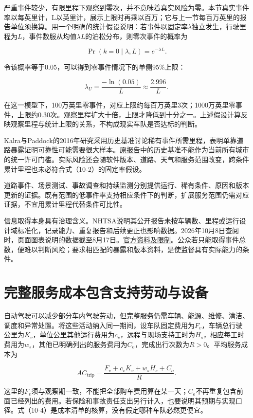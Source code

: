 \documentclass[UTF8,fontset=windows,12pt,a4paper,oneside,openany]{ctexbook}
\begin{document}
严重事件较少，有限里程下观察到零次，并不意味着真实风险为零。本节真实事件率以每英里计，L以英里计，展示上限时再乘以百万；它与上一节每百万英里的报告单位须换算。用一个明确的统计假设说明：若事件以固定率\(\lambda\)独立发生，行驶里程为\(L\)，事件数服从均值\(\lambda L\)的泊松分布，则零次事件的概率为

\[
\Pr(k=0\mid\lambda,L)=e^{-\lambda L}.
\tag{10-2}
\]

令该概率等于0.05，可以得到零事件情况下的单侧95\%上限：

\[
\lambda_U=\frac{-\ln(0.05)}{L}\approx\frac{2.996}{L}.
\tag{10-3}
\]

在这一模型下，100万英里零事件，对应上限约每百万英里3次；1000万英里零事件，上限约0.30次。观察里程扩大十倍，上限才降低到十分之一。上述假设计算反映观察里程与统计上限的关系，不构成现实车队是否达标的判断。

Kalra与Paddock的2016年研究采用历史基准讨论稀有事件所需里程，表明单靠道路暴露证明可靠性可能需要很大样本。\href{https://doi.org/10.7249/RR1478}{原报告}中的历史基准不能作为当前所有城市的统一许可门槛。实际风险还会随软件版本、道路、天气和服务范围改变，跨条件累计里程也未必符合式（10-2）的固定率假设。

道路事件、场景测试、事故调查和持续监测分别提供运行、稀有条件、原因和版本更新的证据。既有范围的低事件率支持相应条件下的判断，扩展服务范围仍需对应证据，不宜用累计里程代替条件可比性。

信息取得本身具有治理含义。NHTSA说明其公开报告未按车辆数、里程或运行设计域标准化，记录能力、重复报告和后续更正也影响数据。2026年10月8日查阅时，页面图表说明的数据截至8月17日。\href{https://www.nhtsa.gov/laws-regulations/standing-general-order-crash-reporting}{官方资料及限制}。公众若只能取得事件总数，便难以判断风险；要求相匹配的暴露和版本资料，是使监督具有实际能力的条件。

\section{完整服务成本包含支持劳动与设备}

自动驾驶可以减少部分车内驾驶劳动，但完整服务仍需车辆、能源、维修、清洁、调度和异常处置。将这些活动纳入同一期间，设车队固定费用为\(F_v\)，车辆总行驶公里为\(K_v\)，单位公里其他运行费用为\(c_v\)，远程与现场支持工时为\(H_s\)，相应每工时费用为\(w_s\)，其他已明确列出的服务费用为\(C_o\)，完成出行次数为\(R>0\)。平均服务成本为

\[
AC_{\mathrm{trip}}
=\frac{F_v+c_vK_v+w_sH_s+C_o}{R}.
\tag{10-4}
\]

这里的\(F_v\)须与观察期一致，不能把全部购车费用算在某一天；\(C_o\)不再重复包含前面已经列出的费用。若保险和事故责任支出另行计入，也要说明其预期与实现口径。式（10-4）是成本清单的核算，没有假定哪种车队必然更便宜。
\end{document}
